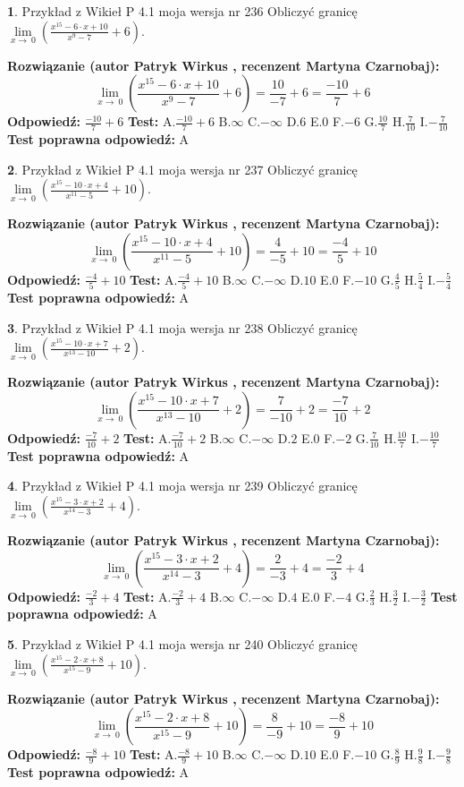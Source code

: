 \documentclass[12pt, a4paper]{article}
\theoremstyle{definition} %
\newtheorem{zad}{}
\newcommand{\zadStart}[1]{\begin{zad}#1\newline}
\newcommand{\zadStop}{\end{zad}}
\newcommand{\rozwStart}[2]{\noindent \textbf{Rozwiązanie (autor #1 , recenzent #2): }\newline}
\newcommand{\rozwStop}{\newline}
\newcommand{\odpStart}{\noindent \textbf{Odpowiedź:}\newline}
\newcommand{\odpStop}{\newline}
\newcommand{\testStart}{\noindent \textbf{Test:}\newline}
\newcommand{\testStop}{\newline}
\newcommand{\kluczStart}{\noindent \textbf{Test poprawna odpowiedź:}\newline}
\newcommand{\kluczStop}{\newline}
\begin{document}
\zadStart{Przykład z Wikieł P 4.1 moja wersja nr 236}
Obliczyć granicę $\lim\limits_{x\to\ 0}(\frac{x^{15}-6 \cdot x +10}{x^{9}-7}+6)$.
\zadStop
\rozwStart{Patryk Wirkus}{Martyna Czarnobaj}
$$\lim\limits_{x\to\ 0}(\frac{x^{15}-6 \cdot x +10}{x^{9}-7}+6)=\frac{10}{-7}+6=\frac{-10}{7}+6$$
\rozwStop
\odpStart
$\frac{-10}{7}+6$
\odpStop
\testStart
A.$\frac{-10}{7}+6$
B.$\infty$
C.$-\infty$
D.$6$
E.$0$
F.$-6$
G.$\frac{10}{7}$
H.$\frac{7}{10}$
I.$-\frac{7}{10}$
\testStop
\kluczStart
A
\kluczStop



\zadStart{Przykład z Wikieł P 4.1 moja wersja nr 237}
Obliczyć granicę $\lim\limits_{x\to\ 0}(\frac{x^{15}-10 \cdot x +4}{x^{11}-5}+10)$.
\zadStop
\rozwStart{Patryk Wirkus}{Martyna Czarnobaj}
$$\lim\limits_{x\to\ 0}(\frac{x^{15}-10 \cdot x +4}{x^{11}-5}+10)=\frac{4}{-5}+10=\frac{-4}{5}+10$$
\rozwStop
\odpStart
$\frac{-4}{5}+10$
\odpStop
\testStart
A.$\frac{-4}{5}+10$
B.$\infty$
C.$-\infty$
D.$10$
E.$0$
F.$-10$
G.$\frac{4}{5}$
H.$\frac{5}{4}$
I.$-\frac{5}{4}$
\testStop
\kluczStart
A
\kluczStop



\zadStart{Przykład z Wikieł P 4.1 moja wersja nr 238}
Obliczyć granicę $\lim\limits_{x\to\ 0}(\frac{x^{15}-10 \cdot x +7}{x^{13}-10}+2)$.
\zadStop
\rozwStart{Patryk Wirkus}{Martyna Czarnobaj}
$$\lim\limits_{x\to\ 0}(\frac{x^{15}-10 \cdot x +7}{x^{13}-10}+2)=\frac{7}{-10}+2=\frac{-7}{10}+2$$
\rozwStop
\odpStart
$\frac{-7}{10}+2$
\odpStop
\testStart
A.$\frac{-7}{10}+2$
B.$\infty$
C.$-\infty$
D.$2$
E.$0$
F.$-2$
G.$\frac{7}{10}$
H.$\frac{10}{7}$
I.$-\frac{10}{7}$
\testStop
\kluczStart
A
\kluczStop



\zadStart{Przykład z Wikieł P 4.1 moja wersja nr 239}
Obliczyć granicę $\lim\limits_{x\to\ 0}(\frac{x^{15}-3 \cdot x +2}{x^{14}-3}+4)$.
\zadStop
\rozwStart{Patryk Wirkus}{Martyna Czarnobaj}
$$\lim\limits_{x\to\ 0}(\frac{x^{15}-3 \cdot x +2}{x^{14}-3}+4)=\frac{2}{-3}+4=\frac{-2}{3}+4$$
\rozwStop
\odpStart
$\frac{-2}{3}+4$
\odpStop
\testStart
A.$\frac{-2}{3}+4$
B.$\infty$
C.$-\infty$
D.$4$
E.$0$
F.$-4$
G.$\frac{2}{3}$
H.$\frac{3}{2}$
I.$-\frac{3}{2}$
\testStop
\kluczStart
A
\kluczStop



\zadStart{Przykład z Wikieł P 4.1 moja wersja nr 240}
Obliczyć granicę $\lim\limits_{x\to\ 0}(\frac{x^{15}-2 \cdot x +8}{x^{15}-9}+10)$.
\zadStop
\rozwStart{Patryk Wirkus}{Martyna Czarnobaj}
$$\lim\limits_{x\to\ 0}(\frac{x^{15}-2 \cdot x +8}{x^{15}-9}+10)=\frac{8}{-9}+10=\frac{-8}{9}+10$$
\rozwStop
\odpStart
$\frac{-8}{9}+10$
\odpStop
\testStart
A.$\frac{-8}{9}+10$
B.$\infty$
C.$-\infty$
D.$10$
E.$0$
F.$-10$
G.$\frac{8}{9}$
H.$\frac{9}{8}$
I.$-\frac{9}{8}$
\testStop
\kluczStart
A
\kluczStop
\end{document}
